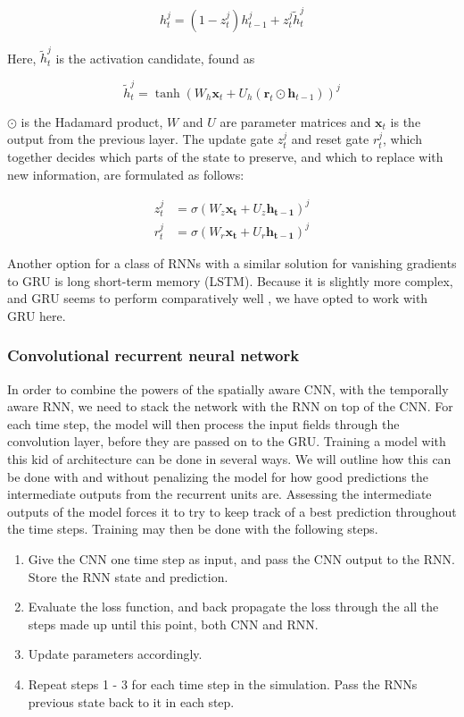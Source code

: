 \documentclass[a4paper]{article}
\renewcommand{\vec}[1]{\mathbf{#1}}
\begin{document}
$$ h_t^j = (1 - z_t^j)h_{t-1}^j + z_t^j \tilde{h}_t^j $$

Here, $\tilde{h}_t^j$ is the activation candidate, found as

$$ \tilde{h}_t^j = \tanh{(W_h \vec{x}_t + U_h(\vec{r}_t \odot \vec{h}_{t-1}))^j} $$

$\odot$ is the Hadamard product, $W$ and $U$ are parameter matrices and $\vec{x}_t$ is the output from the previous layer. The update gate $z_t^j$ and reset gate $r_t^j$, which together decides which parts of the state to preserve, and which to replace with new information, are formulated as follows:

\begin{align*}
z_t^j &= \sigma (W_z \mathbf{x_t} + U_z \mathbf{h_{t-1}})^j \\
r_t^j &= \sigma (W_r \mathbf{x_t} + U_r \mathbf{h_{t-1}})^j
\end{align*}

Another option for a class of RNNs with a similar solution for vanishing gradients to GRU is long short-term memory (LSTM). Because it is slightly more complex, and GRU seems to perform comparatively well \cite{gru_vs_lstm}, we have opted to work with GRU here.

\subsubsection{Convolutional recurrent neural network}
\label{subsubsec:crnn_theory}

In order to combine the powers of the spatially aware CNN, with the temporally aware RNN, we need to stack the network with the RNN on top of the CNN. For each time step, the model will then process the input fields through the convolution layer, before they are passed on to the GRU. Training a model with this kid of architecture can be done in several ways. We will outline how this can be done with and without penalizing the model for how good predictions the intermediate outputs from the recurrent units are. Assessing the intermediate outputs of the model forces it to try to keep track of a best prediction throughout the time steps. Training may then be done with the following steps.

\begin{enumerate}
    \item Give the CNN one time step as input, and pass the CNN output to the RNN. Store the RNN state and prediction.
    \item Evaluate the loss function, and back propagate the loss through the all the steps made up until this point, both CNN and RNN.
    \item Update parameters accordingly.
    \item Repeat steps 1 - 3 for each time step in the simulation. Pass the RNNs previous state back to it in each step.
\end{enumerate}
\end{document}
